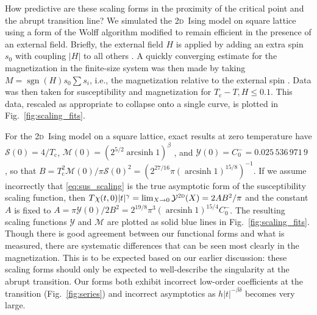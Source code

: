 \documentclass[aps,prl,reprint]{revtex4-1}
\def\arcsinh{\mathop{\mathrm{arcsinh}}\nolimits}
\def\sgn{\mathop{\mathrm{sgn}}\nolimits}
\def\c{\mathrm c}
\def\fM{\mathcal M}  %
\def\fX{\mathcal Y}  %
\def\fS{\mathcal S}  %
\def\twodee{\textsc{2d}}
\begin{document}
How predictive are these scaling forms in the proximity of the critical point
and the abrupt transition line? We simulated the \twodee\ Ising model on square
lattice using a form of the Wolff algorithm modified to remain efficient in
the presence of an external field. Briefly, the external field $H$ is applied
by adding an extra spin $s_0$ with coupling $|H|$ to all others
\cite{dimitrovic.1991.finite}. A quickly converging estimate for the
magnetization in the finite-size system was then made by taking
$M=\sgn(H)s_0\sum s_i$, i.e., the magnetization relative to the external spin
\cite{kent-dobias.2018.wolff}.
Data was then taken for susceptibility and magnetization for
$T_\c-T,H\leq0.1$. This data, rescaled as appropriate to collapse onto a
single curve, is plotted in Fig.~\ref{fig:scaling_fits}.

For the \twodee\ Ising model on a square lattice, exact results at zero
temperature have $\fS(0)=4/T_\c$, $\fM(0)=(2^{5/2}\arcsinh1)^\beta$
\cite{onsager.1944.crystal}, and $\fX(0)=C_0^-=0.025\,536\,971\,9$ \cite{barouch.1973.susceptibility}, so that
$B=T_\c^2\fM(0)/\pi\fS(0)^2=(2^{27/16}\pi(\arcsinh1)^{15/8})^{-1}$. If we
assume incorrectly that \eqref{eq:sus_scaling} is the true asymptotic form of
the susceptibility scaling function, then
$T\chi(t,0)|t|^\gamma=\lim_{X\to0}\fX^\twodee(X)=2AB^2/\pi$ and the constant
$A$ is fixed to $A=\pi\fX(0)/2B^2=2^{19/8}\pi^3(\arcsinh1)^{15/4}C_0^-$.  The
resulting scaling functions $\fX$ and $\fM$ are plotted as solid blue lines in
Fig.~\ref{fig:scaling_fits}. Though there is good agreement
between our functional forms and what is measured, there
are systematic differences that can be seen most clearly in the
magnetization. This is to be expected based on our earlier discussion: these
scaling forms should only be expected to well-describe the singularity at the
abrupt transition. Our forms both exhibit incorrect low-order
coefficients at the transition (Fig.~\ref{fig:series}) and incorrect
asymptotics as $h|t|^{-\beta\delta}$ becomes very large.
\end{document}
